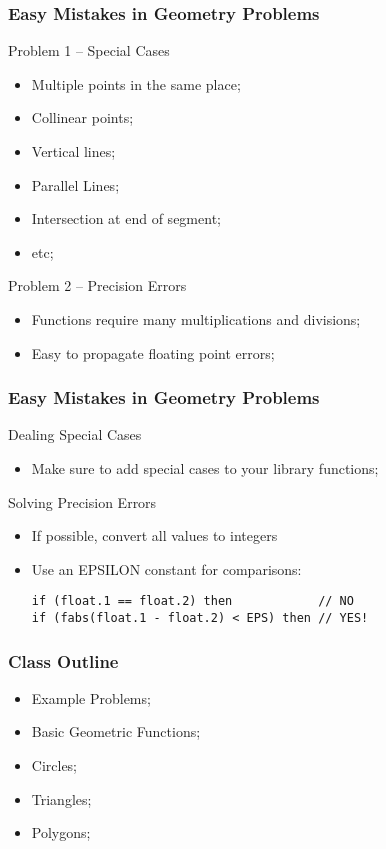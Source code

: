 \begin{frame}
  \frametitle{Easy Mistakes in Geometry Problems}

  {\small
    \begin{block}{Problem 1 -- Special Cases}
      \begin{itemize}
      \item Multiple points in the same place;
      \item Collinear points;
      \item Vertical lines;
      \item Parallel Lines;
      \item Intersection at end of segment;
      \item etc;
      \end{itemize}
    \end{block}

    \begin{block}{Problem 2 -- Precision Errors}
      \begin{itemize}
      \item Functions require many multiplications and divisions;
      \item Easy to propagate floating point errors;
      \end{itemize}
    \end{block}
  }
\end{frame}


\begin{frame}[fragile]
  \frametitle{Easy Mistakes in Geometry Problems}

  {\smaller

    \begin{block}{Dealing Special Cases}
      \begin{itemize}
      \item Make sure to add special cases to your
        library functions;
      \end{itemize}
    \end{block}

    \begin{block}{Solving Precision Errors}
      \begin{itemize}
      \item If possible, convert all values to integers
      \item Use an EPSILON constant for comparisons:

\begin{verbatim}
if (float.1 == float.2) then            // NO
if (fabs(float.1 - float.2) < EPS) then // YES!
\end{verbatim}

      \end{itemize}
    \end{block}
  }
\end{frame}

\begin{frame}
  \frametitle{Class Outline}
  \begin{itemize}
  \item Example Problems;
  \item Basic Geometric Functions;
  \item Circles;
  \item Triangles;
  \item Polygons;
  \end{itemize}
\end{frame}
